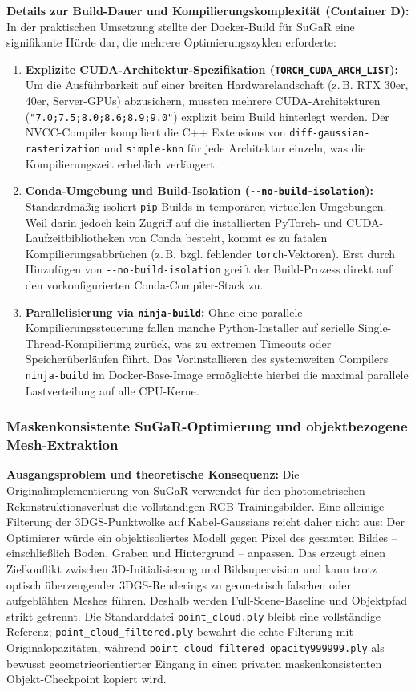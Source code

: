 \documentclass[12pt,a4paper]{article}
\begin{document}
\textbf{Details zur Build-Dauer und Kompilierungskomplexität (Container D):}\\
In der praktischen Umsetzung stellte der Docker-Build für SuGaR eine signifikante Hürde dar, die mehrere Optimierungszyklen erforderte:
\begin{enumerate}[noitemsep]
    \item \textbf{Explizite CUDA-Architektur-Spezifikation (\texttt{TORCH\_CUDA\_ARCH\_LIST}):} Um die Ausführbarkeit auf einer breiten Hardwarelandschaft (z.\,B. RTX 30er, 40er, Server-GPUs) abzusichern, mussten mehrere CUDA-Architekturen (\texttt{"7.0;7.5;8.0;8.6;8.9;9.0"}) explizit beim Build hinterlegt werden. Der NVCC-Compiler kompiliert die C++ Extensions von \texttt{diff-gaussian-rasterization} und \texttt{simple-knn} für jede Architektur einzeln, was die Kompilierungszeit erheblich verlängert.
    \item \textbf{Conda-Umgebung und Build-Isolation (\texttt{-{}-no-build-isolation}):} Standardmäßig isoliert \texttt{pip} Builds in temporären virtuellen Umgebungen. Weil darin jedoch kein Zugriff auf die installierten PyTorch- und CUDA-Laufzeitbibliotheken von Conda besteht, kommt es zu fatalen Kompilierungsabbrüchen (z.\,B. bzgl. fehlender \texttt{torch}-Vektoren). Erst durch Hinzufügen von \texttt{-{}-no-build-isolation} greift der Build-Prozess direkt auf den vorkonfigurierten Conda-Compiler-Stack zu.
    \item \textbf{Parallelisierung via \texttt{ninja-build}:} Ohne eine parallele Kompilierungssteuerung fallen manche Python-Installer auf serielle Single-Thread-Kompilierung zurück, was zu extremen Timeouts oder Speicherüberläufen führt. Das Vorinstallieren des systemweiten Compilers \texttt{ninja-build} im Docker-Base-Image ermöglichte hierbei die maximal parallele Lastverteilung auf alle CPU-Kerne.
\end{enumerate}

\subsubsection*{Maskenkonsistente SuGaR-Optimierung und objektbezogene Mesh-Extraktion}
\textbf{Ausgangsproblem und theoretische Konsequenz:} Die Originalimplementierung von SuGaR verwendet für den photometrischen Rekonstruktionsverlust die vollständigen RGB-Trainingsbilder. Eine alleinige Filterung der 3DGS-Punktwolke auf Kabel-Gaussians reicht daher nicht aus: Der Optimierer würde ein objektisoliertes Modell gegen Pixel des gesamten Bildes -- einschließlich Boden, Graben und Hintergrund -- anpassen. Das erzeugt einen Zielkonflikt zwischen 3D-Initialisierung und Bildsupervision und kann trotz optisch überzeugender 3DGS-Renderings zu geometrisch falschen oder aufgeblähten Meshes führen. Deshalb werden Full-Scene-Baseline und Objektpfad strikt getrennt. Die Standarddatei \texttt{point\_cloud.ply} bleibt eine vollständige Referenz; \texttt{point\_cloud\_filtered.ply} bewahrt die echte Filterung mit Originalopazitäten, während \texttt{point\_cloud\_filtered\_opacity999999.ply} als bewusst geometrieorientierter Eingang in einen privaten maskenkonsistenten Objekt-Checkpoint kopiert wird.
\end{document}
